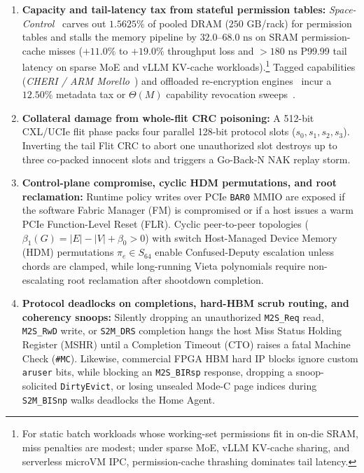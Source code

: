 \documentclass[11pt,letterpaper]{article}
\theoremstyle{spectralthm}
\begin{document}
\begin{enumerate}
  \item \textbf{Capacity and tail-latency tax from stateful permission tables:} \textit{Space-Control}~\cite{goswami2026spacecontrol} carves out $1.5625\%$ of pooled DRAM ($250\text{~GB}$/rack) for permission tables and stalls the memory pipeline by $32.0$--$68.0\text{~ns}$ on SRAM permission-cache misses ($+11.0\%$ to $+19.0\%$ throughput loss and $>180\text{~ns}$ P99.99 tail latency on sparse MoE and vLLM KV-cache workloads).\footnote{For static batch workloads whose working-set permissions fit in on-die SRAM, miss penalties are modest; under sparse MoE, vLLM KV-cache sharing, and serverless microVM IPC, permission-cache thrashing dominates tail latency.} Tagged capabilities (\textit{CHERI / ARM Morello}~\cite{woodruff2014cheri, watson2015cheri}) and offloaded re-encryption engines~\cite{li2025aiore, xu2024dataenclave} incur a $12.50\%$ metadata tax or $\Theta(M)$ capability revocation sweeps~\cite{filardo2020cornucopia, filardo2024cornucopiareloaded}.
  \item \textbf{Collateral damage from whole-flit CRC poisoning:} A 512-bit CXL/UCIe flit phase packs four parallel 128-bit protocol slots ($s_0, s_1, s_2, s_3$). Inverting the tail Flit CRC to abort one unauthorized slot destroys up to three co-packed innocent slots and triggers a Go-Back-N NAK replay storm.
  \item \textbf{Control-plane compromise, cyclic HDM permutations, and root reclamation:} Runtime policy writes over PCIe \texttt{BAR0} MMIO are exposed if the software Fabric Manager (FM) is compromised or if a host issues a warm PCIe Function-Level Reset (FLR). Cyclic peer-to-peer topologies ($\beta_1(G) = |E| - |V| + \beta_0 > 0$) with switch Host-Managed Device Memory (HDM) permutations $\pi_e \in S_{64}$ enable Confused-Deputy escalation unless chords are clamped, while long-running Vieta polynomials require non-escalating root reclamation after shootdown completion.
  \item \textbf{Protocol deadlocks on completions, hard-HBM scrub routing, and coherency snoops:} Silently dropping an unauthorized \texttt{M2S\_Req} read, \texttt{M2S\_RwD} write, or \texttt{S2M\_DRS} completion hangs the host Miss Status Holding Register (MSHR) until a Completion Timeout (CTO) raises a fatal Machine Check (\texttt{\#MC}). Likewise, commercial FPGA HBM hard IP blocks ignore custom \texttt{aruser} bits, while blocking an \texttt{M2S\_BIRsp} response, dropping a snoop-solicited \texttt{DirtyEvict}, or losing unsealed Mode-C page indices during \texttt{S2M\_BISnp} walks deadlocks the Home Agent.
\end{enumerate}
\end{document}
